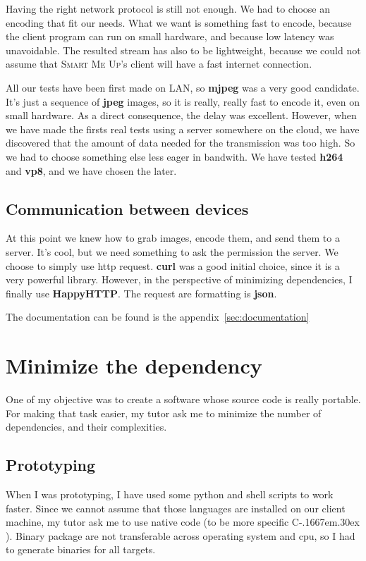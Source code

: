 \documentclass[a4paper,11pt]{custom}
\newcommand{\smu}{\textsc{Smart Me Up}}
\newcommand{\curl}{\textbf{curl}\xspace}
\newcommand{\happyhttp}{\textbf{HappyHTTP}\xspace}
\newcommand{\mjpeg}{\textbf{mjpeg}\xspace}
\newcommand{\jpeg}{\textbf{jpeg}\xspace}
\newcommand{\vpx}{\textbf{vp8}\xspace}
\newcommand{\mpeg}{\textbf{h264}\xspace}
\newcommand{\cpp}{%
  C\kern-.1667em\raise.30ex\hbox{\smaller{++}\xspace}%
  \spacefactor1000%
}
\newcommand{\json}{\textbf{json}\xspace}
\begin{document}
Having the right network protocol is still not enough. We had to choose an
encoding that fit our needs. What we want is something fast to encode,
because the client program can run on small hardware, and because low latency
was unavoidable. The resulted stream has also to be lightweight, because we
could not assume that \smu's client will have a fast internet connection.

All our tests have been first made on LAN, so \mjpeg{} was a very good
candidate. It's just a sequence of \jpeg{} images, so it is really, really fast
to encode it, even on small hardware. As a direct consequence, the delay was
excellent. However, when we have made the firsts real tests using a server
somewhere on the cloud, we have discovered that the amount of data needed for the
transmission was too high. So we had to choose something else less eager in
bandwith. We have tested \mpeg{} and \vpx, and we have chosen the later.

\subsection{Communication between devices}
\label{sec:communication}

At this point we knew how to grab images, encode them, and send them to a
server. It's cool, but we need something to ask the permission the server. We
choose to simply use http request. \curl{} was a good initial choice, since it
is a very powerful library. However, in the perspective of minimizing dependencies,
I finally use \happyhttp. The request are formatting is \json.

The documentation can be found is the appendix~\ref{sec:documentation}

\section{Minimize the dependency}

One of my objective was to create a software whose source code is really
portable. For making that task easier, my tutor ask me to minimize the number of
dependencies, and their complexities.

\subsection{Prototyping}

When I was prototyping, I have used some python and shell scripts to work
faster. Since we cannot assume that those languages are installed on our client
machine, my tutor ask me to use native code (to be more specific \cpp). Binary
package are not transferable across operating system and cpu, so I had to
generate binaries for all targets.
\end{document}
